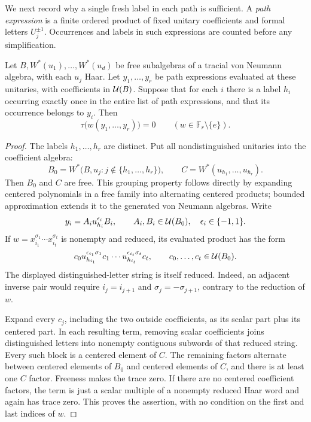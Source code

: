 We next record why a single fresh label in each path is sufficient.
A \emph{path expression} is a finite ordered product of fixed unitary
coefficients and formal letters $U_j^{\pm1}$.  Occurrences and labels in
such expressions are counted before any simplification.

\begin{lemma}\label{lem:distinguished-letters}
Let $B,W^*(u_1),\ldots,W^*(u_d)$ be free subalgebras of a tracial von
Neumann algebra, with each $u_j$ Haar.  Let
$y_1,\ldots,y_r$ be path expressions evaluated at these unitaries, with
coefficients in $\mathcal U(B)$.  Suppose that for each $i$ there is a label
$h_i$ occurring exactly once in the entire list of path expressions,
and that its occurrence belongs to $y_i$.  Then
\[
 \tau\bigl(w(y_1,\ldots,y_r)\bigr)=0
 \qquad(w\in\mathbb F_r\setminus\{e\}).
\]
\end{lemma}

\begin{proof}
The labels $h_1,\ldots,h_r$ are distinct.  Put all nondistinguished
unitaries into the coefficient algebra:
\[
 B_0=W^*\bigl(B,u_j:j\notin\{h_1,\ldots,h_r\}\bigr),
 \qquad
 C=W^*(u_{h_1},\ldots,u_{h_r}).
\]
Then $B_0$ and $C$ are free.  This grouping property follows directly
by expanding centered polynomials in a free family into alternating
centered products; bounded approximation extends it to the generated
von Neumann algebras.  Write
\[
 y_i=A_i u_{h_i}^{\epsilon_i}B_i,
 \qquad A_i,B_i\in\mathcal U(B_0),\quad \epsilon_i\in\{-1,1\}.
\]
If $w=x_{i_1}^{\sigma_1}\cdots x_{i_t}^{\sigma_t}$ is nonempty and
reduced, its evaluated product has the form
\[
 c_0 u_{h_{i_1}}^{\epsilon_{i_1}\sigma_1}c_1
 \cdots u_{h_{i_t}}^{\epsilon_{i_t}\sigma_t}c_t,
 \qquad c_0,\ldots,c_t\in\mathcal U(B_0).
\]
The displayed distinguished-letter string is itself reduced.  Indeed,
an adjacent inverse pair would require $i_j=i_{j+1}$ and
$\sigma_j=-\sigma_{j+1}$, contrary to the reduction of $w$.

Expand every $c_j$, including the two outside coefficients, as its
scalar part plus its centered part.  In each resulting term, removing
scalar coefficients joins distinguished letters into nonempty
contiguous subwords of that reduced string.  Every such block is a
centered element of $C$.  The remaining factors alternate between
centered elements of $B_0$ and centered elements of $C$, and there is
at least one $C$ factor.  Freeness makes the trace zero.  If there are
no centered coefficient factors, the term is just a scalar multiple of
a nonempty reduced Haar word and again has trace zero.  This proves
the assertion, with no condition on the first and last indices of $w$.
\end{proof}

